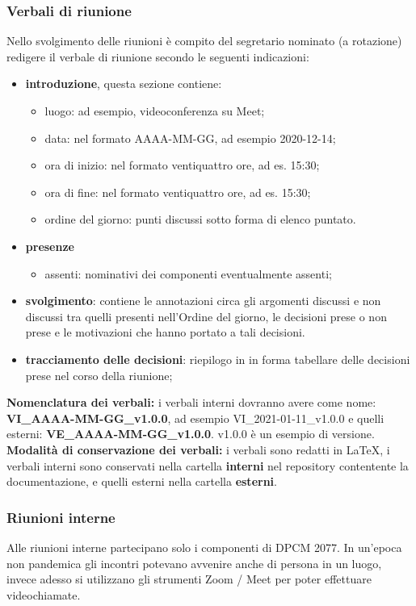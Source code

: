 \subsubsection{Verbali di riunione}
Nello svolgimento delle riunioni è compito del segretario nominato (a rotazione) redigere il verbale di riunione secondo le seguenti indicazioni:
\begin{itemize}
\item{\textbf{introduzione}, questa sezione contiene:}
	\begin{itemize}
	\item{luogo: ad esempio, videoconferenza su Meet;}
	\item{data: nel formato AAAA-MM-GG, ad esempio 2020-12-14;}
	\item{ora di inizio:  nel formato ventiquattro ore, ad es. 15:30;}
	\item{ora di fine:  nel formato ventiquattro ore, ad es. 15:30;}
	\item{ordine del giorno: punti discussi sotto forma di elenco puntato.}
	\end{itemize}
\item{\textbf{presenze}}
	\begin{itemize}
	\item{assenti: nominativi dei componenti eventualmente assenti;}
	\end{itemize}
\item{\textbf{svolgimento}: contiene le annotazioni circa gli argomenti discussi e non discussi tra quelli presenti nell’Ordine del giorno, le decisioni prese o non prese e le motivazioni che hanno portato a tali decisioni.}
\item{\textbf{tracciamento delle decisioni}: riepilogo in in forma tabellare delle decisioni prese nel corso della riunione;}
\end{itemize}
\textbf{Nomenclatura dei verbali: } i verbali interni dovranno avere come nome: \textbf{VI\_AAAA-MM-GG\_v1.0.0}, ad esempio VI\_2021-01-11\_v1.0.0 e quelli esterni: \textbf{VE\_AAAA-MM-GG\_v1.0.0}. v1.0.0 è un esempio di versione.\\
\textbf{Modalità di conservazione dei verbali:} i verbali sono redatti in \LaTeX, i verbali interni sono conservati nella cartella \textbf{interni} nel repository  contentente la documentazione, e quelli esterni nella cartella \textbf{esterni}.

\subsubsection{Riunioni interne}
Alle riunioni interne partecipano solo i componenti di DPCM 2077.
In un'epoca non pandemica gli incontri potevano avvenire anche di persona in un luogo, invece adesso si utilizzano gli strumenti Zoom / Meet per poter effettuare videochiamate.

